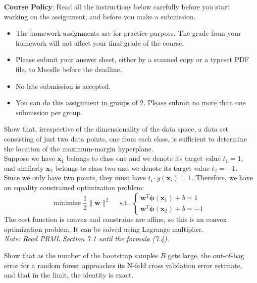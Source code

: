 \documentclass[a4 paper]{article}
\begin{document}
\textbf{Course Policy}: Read all the instructions below carefully before you start working on the assignment, and before you make a submission.
\begin{itemize}
    \item The homework assignments are for practice purpose. The grade from your homework will not affect your final grade of the course.
    \item Please submit your answer sheet, either by a scanned copy or a typeset PDF file, to Moodle before the deadline.
    \item No late submission is accepted.
    \item You can do this assignment in groups of 2. Please submit no more than one submission per group.
\end{itemize}

 Show that, irrespective of the dimensionality of the data space, a data set consisting of just two data points, one from each class, is sufficient to determine the location of the maximum-margin hyperplane.\\

Suppose we have $\mathbf{x}_{1}$ belongs to class one and we denote its target value $t_{1}=1,$ and similarly $\mathbf{x}_{2}$ belongs to class two and we denote its target value $t_{2}=-1 .$ Since we only have two points, they must have $t_{i} \cdot y\left(\mathbf{x}_{i}\right)=1$. Therefore, we have an equality constrained optimization problem:
\[
\operatorname{minimize} \frac{1}{2}\|\mathbf{w}\|^{2} \quad \text { s.t. }\left\{\begin{array}{l}
\mathbf{w}^{T} \boldsymbol{\phi}\left(\mathbf{x}_{1}\right)+b=1 \\
\mathbf{w}^{T} \boldsymbol{\phi}\left(\mathbf{x}_{2}\right)+b=-1
\end{array}\right.
\]
The cost function is convex and constrains are affine, so this is an convex optimization problem. It can be solved using Lagrange multiplier.\\

\textit{Note: Read PRML Section 7.1 until the formula (7.4).}



 Show that as the number of the bootstrap samples $B$ gets large, the out-of-bag error for a random forest approaches its N-fold cross validation error estimate, and that in the limit, the identity is exact.\\
\end{document}
